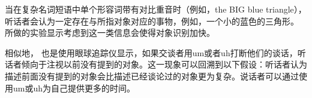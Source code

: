 
当在复杂名词短语中单个形容词带有对比重音时（例如，the BIG blue triangle），听话者会认为一定存在与所指对象对应的事物，例如，一个小的蓝色的三角形。 \citet{TSKES96a}所做的实验显示考虑到这一类信息会使得对象识别加快。

相似地， \citet{ATAF2004a}也是使用眼球追踪仪显示，如果交谈者用um或者uh打断他们的谈话，听话者倾向于注视以前没有提到的对象。这一现象可以回溯到以下假设：听话者认为描述前面没有提到的对象会比描述已经谈论过的对象更为复杂。说话者可以通过使用um或uh为自己提供更多的时间。

